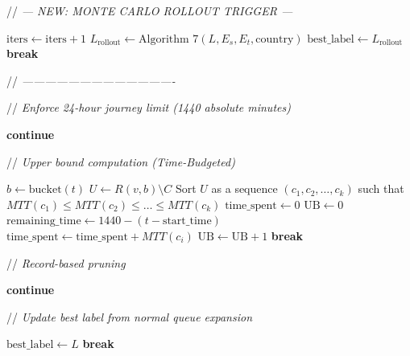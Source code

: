 \documentclass{article}
\newcommand{\CommentLine}[1]{
    \State // \textit{#1}
}
\begin{document}
\begin{algorithmic}[1]
        \vspace{0.5em}
        \CommentLine{--- NEW: MONTE CARLO ROLLOUT TRIGGER ---}
        \State $\text{iters} \leftarrow \text{iters} + 1$
            \State $L_{\text{rollout}} \leftarrow \text{Algorithm 7}(L,E_s,E_t,\text{country})$
                \State $\text{best\_label} \leftarrow L_{\text{rollout}}$
                    \State \textbf{break} 
                \EndIf
            \EndIf
\vspace{0.5em}
        \CommentLine{----------------------------------------}
        \EndIf

        \vspace{0.5em}
        \CommentLine{Enforce 24-hour journey limit (1440 absolute minutes)}
            \State \textbf{continue}
        \EndIf

        \vspace{0.5em}
        \CommentLine{Upper bound computation (Time-Budgeted)}
        \State $b \leftarrow \text{bucket}(t)$
        \State $U \leftarrow R(v,b) \setminus C$
        \State Sort $U$ as a sequence $(c_1, c_2, \ldots, c_k)$ such that $MTT(c_1) \le MTT(c_2) \le \ldots \le MTT(c_k)$
        \State $\text{time\_spent} \leftarrow 0$
        \State $\text{UB} \leftarrow 0$
        \State $\text{remaining\_time} \leftarrow 1440 - (t - \text{start\_time})$
            \State $\text{time\_spent} \leftarrow \text{time\_spent} + MTT(c_i)$
                \State $\text{UB} \leftarrow \text{UB} + 1$
            \Else
                \State \textbf{break}
            \EndIf
        \EndFor

        \vspace{0.5em}
        \CommentLine{Record-based pruning}
            \State \textbf{continue}
        \EndIf

        \vspace{0.5em}
        \CommentLine{Update best label from normal queue expansion}
            \State $\text{best\_label} \leftarrow L$
                \State \textbf{break} 
            \EndIf
        \EndIf


\end{algorithmic}
\end{document}
